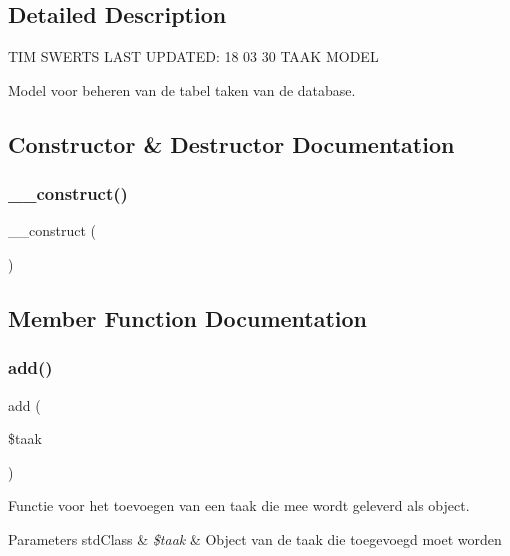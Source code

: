 \subsection{Detailed Description}
T\+IM S\+W\+E\+R\+TS L\+A\+ST U\+P\+D\+A\+T\+ED\+: 18 03 30 T\+A\+AK M\+O\+D\+EL

Model voor beheren van de tabel taken van de database. 

\subsection{Constructor \& Destructor Documentation}
\mbox{\label{class_taken___model_a095c5d389db211932136b53f25f39685}} 
\subsubsection{\texorpdfstring{\+\_\+\+\_\+construct()}{\_\_construct()}}
{\footnotesize\ttfamily \+\_\+\+\_\+construct (\begin{DoxyParamCaption}{ }\end{DoxyParamCaption})}



\subsection{Member Function Documentation}
\mbox{\label{class_taken___model_ab4986b088d8f7831b9a8dce8e97485bb}} 
\subsubsection{\texorpdfstring{add()}{add()}}
{\footnotesize\ttfamily add (\begin{DoxyParamCaption}\item[{}]{\$taak }\end{DoxyParamCaption})}



Functie voor het toevoegen van een taak die mee wordt geleverd als object. 


\begin{DoxyParams}[1]{Parameters}
std\+Class & {\em \$taak} & Object van de taak die toegevoegd moet worden \\
\hline
\end{DoxyParams}
\mbox{\label{class_taken___model_a2f8258add505482d7f00ea26493a5723}} 
